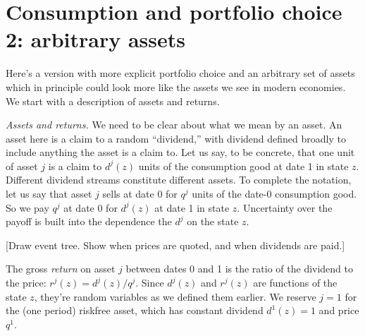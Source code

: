 \documentclass[11pt]{article}
\begin{document}
\begin{comment}
The definition $ r(z) = 1/Q(z)$ gives us
\begin{eqnarray*}
       \{ \beta p(z) u'[c_1(z)] / u'(c_0) \} r(z)  &=& 1 ,
\end{eqnarray*}
a variant of our favorite equation.
It's not all that useful here,
because $r(z)$ for these assets is zero in all states but one,
but if we sum over $z$ we get
\begin{eqnarray*}
     \sum_z  \frac { \beta p(z) u'[c_1(z)] }{ u'(c_0)}\ r(z)  &=&
     E \left( \frac {\beta u'(c_1)}{u'(c_0)} \ r \right)
     \;\;=\;\; 1 ,
     \label{eq:euler-stochastic}
\end{eqnarray*}
a stochastic version of (\ref{eq:euler-deterministic}).
It's a somewhat strange object in this context,
since $r(z)$ is zero in all states by one,
but it illustrates the underlying unity of what we're doing.
\end{comment}


\section{Consumption and portfolio choice 2:  arbitrary assets}

Here's a version with more explicit portfolio choice
and an arbitrary set of assets which in principle could
look more like the assets we see in modern economies.
We start with a description of assets and returns.  

{\it Assets and returns.\/} 
We need to be clear about what we mean by an asset.
An asset here is a claim to a random ``dividend,'' 
with dividend defined broadly to include anything the asset is a claim to.
Let us say, to be concrete, that one unit of asset $j$ is a claim to $d^j(z)$ units
of the consumption good at date 1 in state $z$.
Different dividend streams constitute different assets.
To complete the notation,
let us say that asset $j$ sells at date 0
for $q^j$ units of the date-0 consumption good.
So we pay $q^j$ at date 0 for $d^j(z)$ at date 1 in state $z$.
Uncertainty over the payoff is built into the dependence 
the $d^j$ on the state $z$.  

[Draw event tree. Show when prices are quoted, and when dividends are paid.]

The gross {\it return\/} on asset $j$ between dates 0 and 1 
is the ratio of the dividend to the price: $r^j(z) = d^j(z)/q^j$.
Since $d^j(z)$ and $r^j(z)$ are functions of the state $z$,
they're random variables as we defined them earlier.
We reserve $j=1$ for the (one period) riskfree asset,
which has constant dividend $d^1(z) = 1$ and price $q^1$.
\end{document}
